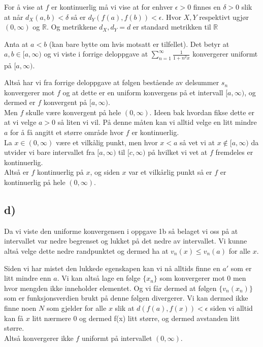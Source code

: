 \documentclass{article}
\begin{document}
      For å vise at $f$ er kontinuerlig må vi vise at for enhver $\epsilon > 0$ finnes en $\delta > 0$ slik at når $d_X(a, b) < \delta$ så er $d_Y(f(a), f(b)) < \epsilon$. Hvor $X, Y$ respektivt ugjør $(0, \infty )$ og $\mathbb{R}$. Og metrikkene $d_X, d_Y = d$ er standard metrikken til $\mathbb{R}$

      Anta at $a < b$ (kan bare bytte om hvis motsatt er tilfellet). Det betyr at $a, b \in [a, \infty)$ og vi viste i forrige deloppgave at $\sum \limits_{n = 1}^\infty \frac{1}{1 + n^2x} $ konvergerer uniformt på $[a, \infty)$.

          Altså har vi fra forrige deloppgave at følgen bestående av delsummer $s_n$ konvergerer mot $f$ og at dette er en uniform konvergens på et intervall $[a, \infty)$, og dermed er $f$ konvergent på $[a, \infty)$.\\
              Men $f$ skulle være konvergent på hele $(0,\infty)$. Ideen bak hvordan fikse dette er at vi velge $a>0$ så liten vi vil. På denne måten kan vi alltid velge en litt mindre $a$ for å få angitt et større område hvor $f$ er kontinuerlig. \\
              La $x \in (0, \infty)$ være et vilkålig punkt, men hvor $x < a$ så vet vi at $x \notin [a, \infty)$ da utvider vi bare intervallet fra $[a, \infty)$ til $[c, \infty)$ på hvilket vi vet at $f$ fremdeles er kontinuerlig.\\
                    Altså er $f$ kontinuerlig på $x$, og siden $x$ var et vilkårlig punkt så er $f$ er kontinuerlig på hele $(0, \infty)$.



                    \subsection*{d)}

                    Da vi viste den uniforme konvergensen i oppgave 1b så belaget vi oss på at intervallet var nedre begrenset og lukket på det nedre av intervallet. Vi kunne altså velge dette nedre randpunktet og dermed ha at $v_n(x) \leq v_n(a)$ for alle $x$.

                    Siden vi har mistet den lukkede egenskapen kan vi nå alltids finne en $a'$ som er litt mindre enn $a$. Vi kan altså lage en følge $\{x_n\}$ som konvergerer mot $0$ men hvor mengden ikke inneholder elementet. Og vi får dermed at følgen $\{v_n(x_n)\}$ som er funksjonsverdien brukt på denne følgen divergerer. Vi kan dermed ikke finne noen $N$ som gjelder for alle $x$ slik at $d(f(a), f(x)) < \epsilon$ siden vi alltid kan få $x$ litt nærmere 0 og dermed f(x) litt større, og dermed avstanden litt større. \\
                    Altså konvergerer ikke $f$ uniformt på intervallet $(0, \infty)$.
\end{document}
